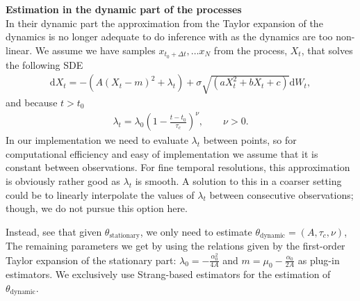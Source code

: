 \textbf{Estimation in the dynamic part of the processes}\\
In their dynamic part the approximation from the Taylor expansion of the dynamics is no longer adequate to do inference with as the dynamics are too non-linear. We assume we have samples $x_{t_0+\Delta t}, \dots x_{N}$ from the process, $X_t$, that solves the following SDE
\begin{align}
    \mathrm{d}X_t = -\left(A(X_t - m)^2 + \lambda_t\right) + \sigma\sqrt{\left(aX_t^2 + bX_t + c\right)}\mathrm{d}W_t, 
\end{align}
and because $t>t_0$
\begin{align}
    \lambda_t = \lambda_0\left(1 - \frac{t - t_0}{\tau_c}\right)^\nu, \qquad \nu >0.
\end{align} 
In our implementation we need to evaluate $\lambda_t$ between points, so for computational efficiency and easy of implementation we assume that it is constant between observations. For fine temporal resolutions, this approximation is obviously rather good as $\lambda_t$ is smooth. A solution to this in a coarser setting could be to linearly interpolate the values of $\lambda_t$ between consecutive observations; though, we do not pursue this option here. 

Instead, see that given $\theta_{\mathrm{stationary}}$, we only need to estimate $\theta_{\mathrm{dynamic}} = (A, \tau_c, \nu)$, The remaining parameters we get by using the relations given by the first-order Taylor expansion of the stationary part: $\lambda_0 = -\frac{\alpha_0^2}{4A}$ and $m = \mu_0 - \frac{\alpha_0}{2A}$ as plug-in estimators. We exclusively use Strang-based estimators for the estimation of $\theta_{\mathrm{dynamic}}$. 
